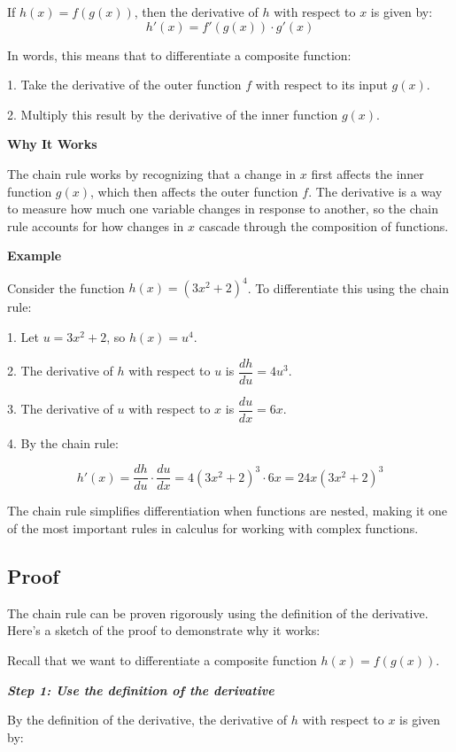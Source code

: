 \documentclass[a4paper,12pt]{book}
\begin{document}
If \( h(x) = f(g(x)) \), then the derivative of \( h \) with respect to \( x \) is given by:
\[
h'(x) = f'(g(x)) \cdot g'(x)
\]

In words, this means that to differentiate a composite function:

1. Take the derivative of the outer function \( f \) with respect to its input \( g(x) \).

2. Multiply this result by the derivative of the inner function \( g(x) \).

\textbf{Why It Works}

The chain rule works by recognizing that a change in \( x \) first affects the inner function \( g(x) \), which then affects the outer function \( f \). The derivative is a way to measure how much one variable changes in response to another, so the chain rule accounts for how changes in \( x \) cascade through the composition of functions.

\textbf{Example}

Consider the function \( h(x) = (3x^2 + 2)^4 \). To differentiate this using the chain rule:

1. Let \( u = 3x^2 + 2 \), so \( h(x) = u^4 \).

2. The derivative of \( h \) with respect to \( u \) is \( \dfrac{dh}{du} = 4u^3 \).

3. The derivative of \( u \) with respect to \( x \) is \( \dfrac{du}{dx} = 6x \).

4. By the chain rule:

\[
h'(x) = \dfrac{dh}{du} \cdot \dfrac{du}{dx} = 4(3x^2 + 2)^3 \cdot 6x = 24x(3x^2 + 2)^3
\]

The chain rule simplifies differentiation when functions are nested, making it one of the most important rules in calculus for working with complex functions.

\subsection{Proof}

The chain rule can be proven rigorously using the definition of the derivative. Here’s a sketch of the proof to demonstrate why it works:

Recall that we want to differentiate a composite function \( h(x) = f(g(x)) \).

\textit{\textbf{Step 1: Use the definition of the derivative}}

By the definition of the derivative, the derivative of \( h \) with respect to \( x \) is given by:
\end{document}
